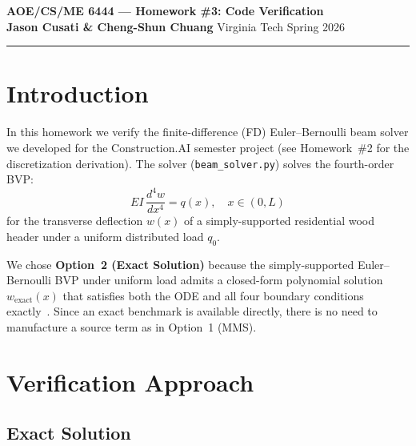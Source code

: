\documentclass[12pt, letterpaper]{article}
\newcommand{\wex}{w_{\mathrm{exact}}}
\begin{document}

\begin{center}
  {\large\bfseries AOE/CS/ME 6444 --- Homework \#3: Code Verification}\\[4pt]
  \textbf{Jason Cusati \& Cheng-Shun Chuang} \quad Virginia Tech \quad Spring 2026
\end{center}

\vspace{-0.5em}\hrule\vspace{0.8em}

\section{Introduction}

In this homework we verify the finite-difference (FD) Euler--Bernoulli beam
solver we developed for the Construction.AI semester project
(see Homework~\#2 for the discretization derivation).
The solver (\texttt{beam\_solver.py}) solves the fourth-order BVP:
\begin{equation}
  EI\,\frac{d^4w}{dx^4} = q(x), \quad x \in (0,L)
\end{equation}
for the transverse deflection $w(x)$ of a simply-supported residential wood header
under a uniform distributed load $q_0$.

We chose \textbf{Option~2 (Exact Solution)} because the simply-supported
Euler--Bernoulli BVP under uniform load admits a closed-form polynomial
solution $\wex(x)$ that satisfies both the ODE and all four boundary conditions
exactly~\cite{gere2018}.
Since an exact benchmark is available directly, there is no need to manufacture
a source term as in Option~1 (MMS).

\section{Verification Approach}

\subsection{Exact Solution}
\end{document}
